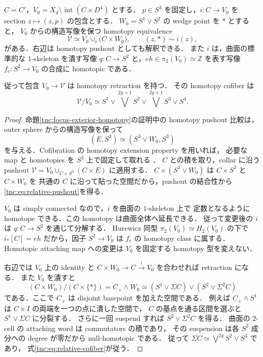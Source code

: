 \begin{theorem}
\label{tnc:relative-pushout}
$C=C'$，$V_0=\overline{X_d\setminus\operatorname{int}(C\times D^4)}$ とする．
$p\in S^3$ を固定し，$i:C\to V_0$ を section $z\mapsto(z,p)$ の包含とする．
$W_0=S^1\vee S^2$ の wedge point を $*$ とすると，
$V_0$ からの構造写像を保つ homotopy equivalence
\begin{equation}\label{tnc:eq:relative-pushout}
 \mathcal V\simeq
 V_0\cup_i\bigl(C\times W_0\bigr),
 \qquad (z,*)\sim i(z),
\end{equation}
がある．右辺は homotopy pushout としても解釈できる．
また $i$ は，曲面の標準的な $1$-skeleton を潰す写像
$q:C\to S^2$ と，$e h\in\pi_2(V_0)\simeq\mathbb Z$ を表す写像
$f_e:S^2\to V_0$ の合成に homotopic である．

従って包含 $V_0\to\mathcal V$ は homotopy retraction を持つ．
その homotopy cofiber は
\begin{equation}\label{tnc:eq:relative-cofiber}
 \mathcal V/V_0\simeq
 S^1\vee\bigvee^{2g+1}S^2
 \vee\bigvee^{2g+1}S^3\vee S^4.
\end{equation}
\end{theorem}

\begin{proof}
命題\ref{tnc:focus-exterior-homotopy}の証明中の homotopy pushout 比較は，
outer sphere からの構造写像を保って
\[
 (E,S^3)\simeq(S^3\vee W_0,S^3)
\]
を与える．Cofibration の homotopy extension property を用いれば，
必要な map と homotopies を $S^3$ 上で固定して取れる
\cite[Propositions~0.18--0.19]{hatcher-bct}．
$C$ との積を取り，collar に沿う pushout
$\mathcal V=V_0\cup_{C\times S^3}(C\times E)$ に適用する．
$C\times(S^3\vee W_0)$ は $C\times S^3$ と $C\times W_0$ を
共通の $C$ に沿って貼った空間だから，pushout の結合性から
\eqref{tnc:eq:relative-pushout}を得る．

$V_0$ は simply connected なので，$i$ を曲面の $1$-skeleton 上で
定数となるように homotope できる．この homotopy は曲面全体へ延長できる．
従って変更後の $i$ は $q:C\to S^2$ を通じて分解する．
Hurewicz 同型 $\pi_2(V_0)\simeq H_2(V_0)$ の下で
$i_*[C]=e h$ だから，因子 $S^2\to V_0$ は $f_e$ の homotopy class に属する．
Homotopic attaching map への変更は $V_0$ を固定する homotopy 型を変えない．

右辺では $V_0$ 上の identity と
$C\times W_0\to C\xrightarrow{i}V_0$ を合わせれば retraction になる．
また $V_0$ を潰すと
\[
 (C\times W_0)/(C\times\{*\})
 = C_+\wedge W_0
 \simeq (S^1\vee\Sigma C)\vee(S^2\vee\Sigma^2C)
\]
である．ここで $C_+$ は disjoint basepoint を加えた空間である．
例えば $C_+\wedge S^1$ は $C\times I$ の両端を一つの点に潰した空間で，
$C$ の基点を通る区間を選ぶと $S^1\vee\Sigma C$ に分裂する．
さらに一回 suspend すれば $S^2\vee\Sigma^2C$ を得る．
曲面の $2$-cell の attaching word は commutators の積であり，
その suspension は各 $S^2$ 成分への degree が零だから null-homotopic である．
従って $\Sigma C\simeq\bigvee^{2g}S^2\vee S^3$ であり，
式\eqref{tnc:eq:relative-cofiber}が従う．
\end{proof}

